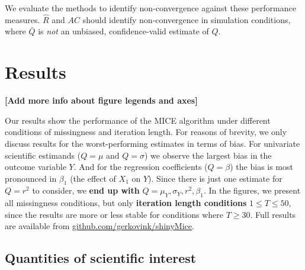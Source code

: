 \documentclass[Royal,times,sageh]{sagej}
\begin{document}
We evaluate the methods to identify non-convergence against these performance measures. \(\widehat{R}\) and \(AC\) should identify non-convergence in simulation conditions, where \(\bar{Q}\) is \emph{not} an unbiased, confidence-valid estimate of \(Q\).

\hypertarget{results}{%
\section{Results}\label{results}}

\textbf{{[}Add more info about figure legends and axes{]}}

Our results show the performance of the MICE algorithm under different conditions of missingness and iteration length. For reasons of brevity, we only discuss results for the worst-performing estimates in terms of bias. For univariate scientific estimands (\(Q=\mu\) and \(Q=\sigma\)) we observe the largest bias in the outcome variable \(Y\). And for the regression coefficients (\(Q=\beta\)) the bias is most pronounced in \(\beta_1\) (the effect of \(X_1\) on \(Y\)). Since there is just one estimate for \(Q=r^2\) to consider, we \textbf{end up with} \(Q=\mu_Y, \sigma_Y,r^2, \beta_1\). In the figures, we present all missingness conditions, but only \textbf{iteration length conditions} \(1 \leq T\leq50\), since the results are more or less stable for conditions where \(T \geq 30\). Full results are available from \href{https://github.com/gerkovink/shinyMice/tree/master/3.Thesis/1.SimulationStudy}{github.com/gerkovink/shinyMice}.

\hypertarget{quantities-of-scientific-interest}{%
\subsection{Quantities of scientific interest}\label{quantities-of-scientific-interest}}
\end{document}
